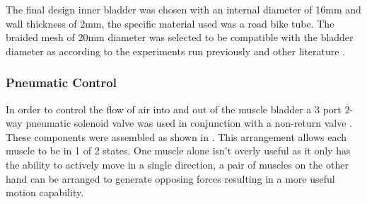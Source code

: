 \documentclass[11pt,a4paper]{article}
\begin{document}
The final design inner bladder was chosen with an internal diameter of 16mm and wall thickness of 2mm, the specific material used was a road bike tube. The braided mesh of 20mm diameter was selected to be compatible with the bladder diameter as according to the experiments run previously and other literature \cite{andrikopoulos_nikolakopoulos_2017}.

\subsubsection{Pneumatic Control}
\label{subsubsection:pneumatic_control}

In order to control the flow of air into and out of the muscle bladder a 3 port 2-way pneumatic solenoid valve was used in conjunction with a non-return valve \cite{airsky_pneumatic}. These components were assembled as shown in . This arrangement allows each muscle to be in 1 of 2 states. One muscle alone isn't overly useful as it only has the ability to actively move in a single direction, a pair of muscles on the other hand can be arranged to generate opposing forces resulting in a more useful motion capability. \newline
\end{document}

